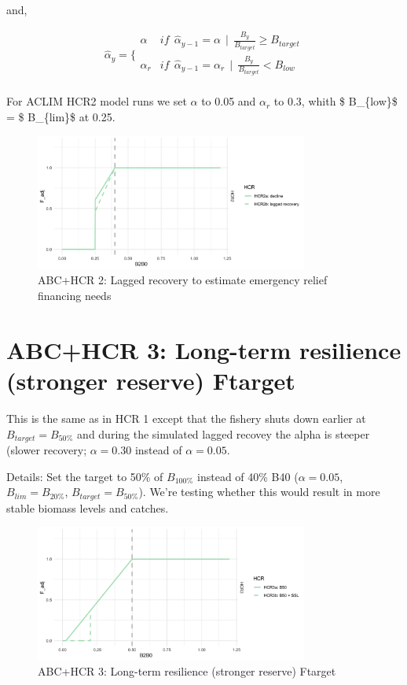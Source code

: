 \documentclass[
]{article}
\begin{document}
and,

\[
 \hat\alpha_y =\{ \begin{array}{ll}  
\alpha & if~~\hat\alpha_{y-1} = \alpha ~~|~~ \frac{B_y}{B_{target}} \geq B_{target} \\  
\alpha_{r} &if ~~\hat\alpha_{y-1} = \alpha_{r} ~~|~~ \frac{B_y}{B_{target}} \lt B_{low} \\  
 \end{array}
 \]

For ACLIM HCR2 model runs we set \(\alpha\) to 0.05 and \(\alpha_{r}\)
to 0.3, whith \$ B\_\{low\}\$ = \$ B\_\{lim\}\$ at 0.25.

\begin{figure}
\centering
\includegraphics[width=0.8\textwidth,height=\textheight]{../../Figs/HCR_figs/HCR2.png}
\caption{ABC+HCR 2: Lagged recovery to estimate emergency relief
financing needs}
\end{figure}

\section{ABC+HCR 3: Long-term resilience (stronger reserve)
Ftarget}\label{abchcr-3-long-term-resilience-stronger-reserve-ftarget}

This is the same as in HCR 1 except that the fishery shuts down earlier
at \(B_{target} = B_{50\%}\) and during the simulated lagged recovey the
alpha is steeper (slower recovery; \(\alpha = 0.30\) instead of
\(\alpha = 0.05\).

Details: Set the target to 50\% of \(B_{100\%}\) instead of 40\% B40
(\(\alpha = 0.05\), \(B_{lim} = B_{20\%}\), \(B_{target} = B_{50\%}\)).
We're testing whether this would result in more stable biomass levels
and catches.

\begin{figure}
\centering
\includegraphics[width=0.8\textwidth,height=\textheight]{../../Figs/HCR_figs/HCR3.png}
\caption{ABC+HCR 3: Long-term resilience (stronger reserve) Ftarget}
\end{figure}
\end{document}

